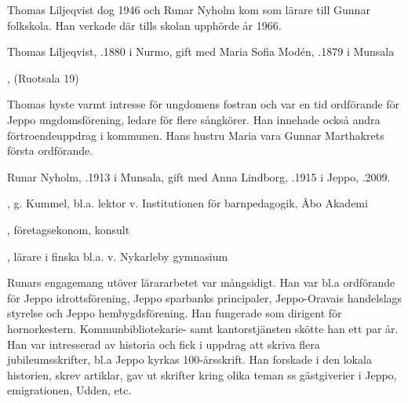 Thomas Liljeqvist dog 1946 och Runar Nyholm kom som lärare till Gunnar folkskola. Han verkade där tills skolan upphörde år 1966.



Thomas Liljeqvist, .1880 i Nurmo, gift med Maria Sofia Modén,  .1879 i Munsala
\begin{jhchildren}
  \item {}
  \item {}
  \item {}
  \item {}
  \item {}, (Ruotsala 19)
\end{jhchildren}
Thomas hyste varmt intresse för ungdomens fostran och var en tid ordförande för Jeppo ungdomsförening, ledare för flere sångkörer. Han innehade också andra förtroendeuppdrag i kommunen. Hans hustru Maria vara Gunnar Marthakrets första ordförande.

Runar Nyholm, .1913 i Munsala, gift med Anna Lindborg, .1915 i Jeppo, .2009.
\begin{jhchildren}
  \item {}, g. Kummel, bl.a. lektor v. Institutionen för barnpedagogik, Åbo Akademi
  \item {}, företagsekonom, konsult
  \item {},  lärare i finska bl.a. v. Nykarleby gymnasium
\end{jhchildren}
Runars engagemang utöver lärararbetet var mångsidigt. Han var bl.a ordförande för  Jeppo idrottsförening, Jeppo sparbanks principaler, Jeppo-Oravais handelslags styrelse och Jeppo hembygdsförening. Han fungerade som dirigent för hornorkestern. Kommunbibliotekarie- samt kantorstjänsten skötte han ett par år. Han var intresserad av historia och fick i uppdrag att skriva flera jubileumsskrifter, bl.a Jeppo kyrkas 100-årsskrift. Han forskade i den lokala historien, skrev artiklar, gav ut skrifter kring olika teman ss gästgiverier i Jeppo, emigrationen, Udden, etc.



